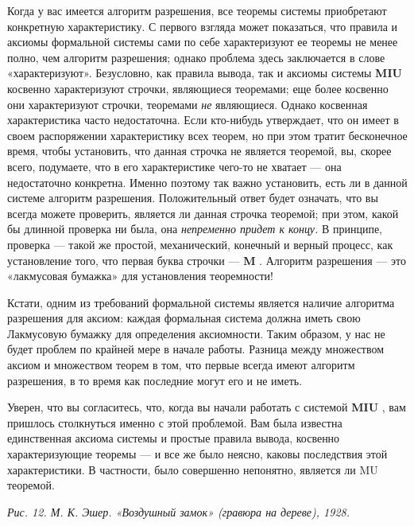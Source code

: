 Когда у вас имеется алгоритм разрешения, все теоремы системы приобретают конкретную характеристику. С первого взгляда может показаться, что правила и аксиомы формальной системы сами по себе характеризуют ее теоремы не менее полно, чем алгоритм разрешения; однако проблема здесь заключается в слове «характеризуют». Безусловно, как правила вывода, так и аксиомы системы \textbf{MIU} косвенно характеризуют строчки, являющиеся теоремами; еще более косвенно они характеризуют строчки, теоремами \emph{не} являющиеся. Однако косвенная характеристика часто недостаточна. Если кто-нибудь утверждает, что он имеет в своем распоряжении характеристику всех теорем, но при этом тратит бесконечное время, чтобы установить, что данная строчка не является теоремой, вы, скорее всего, подумаете, что в его характеристике чего-то не хватает --- она недостаточно конкретна. Именно поэтому так важно установить, есть ли в данной системе алгоритм разрешения. Положительный ответ будет означать, что вы всегда можете проверить, является ли данная строчка теоремой; при этом, какой бы длинной проверка ни была, она \emph{непременно придет к концу.} В принципе, проверка --- такой же простой, механический, конечный и верный процесс, как установление того, что первая буква строчки --- \textbf{M} . Алгоритм разрешения --- это «лакмусовая бумажка» для установления теоремности!

Кстати, одним из требований формальной системы является наличие алгоритма разрешения для аксиом: каждая формальная система должна иметь свою Лакмусовую бумажку для определения аксиомности. Таким образом, у нас не будет проблем по крайней мере в начале работы. Разница между множеством аксиом и множеством теорем в том, что первые всегда имеют алгоритм разрешения, в то время как последние могут его и не иметь.

Уверен, что вы согласитесь, что, когда вы начали работать с системой \textbf{MIU} , вам пришлось столкнуться именно с этой проблемой. Вам была известна единственная аксиома системы и простые правила вывода, косвенно характеризующие теоремы --- и все же было неясно, каковы последствия этой характеристики. В частности, было совершенно непонятно, является ли MU теоремой.

\emph{Рис. 12. М. К. Эшер. «Воздушный замок» (гравюра на дереве), 1928.}

